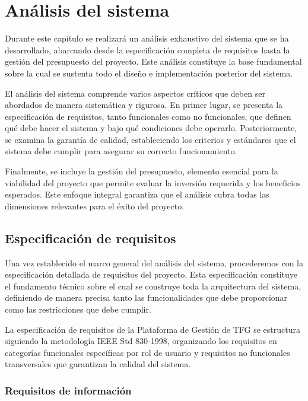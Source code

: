 \documentclass[12pt,a4paper,oneside]{report}
\begin{document}
\chapter{Análisis del sistema}\label{anuxe1lisis-del-sistema}
Durante este capítulo se realizará un análisis exhaustivo del sistema
que se ha desarrollado, abarcando desde la especificación completa de
requisitos hasta la gestión del presupuesto del proyecto. Este análisis
constituye la base fundamental sobre la cual se sustenta todo el diseño
e implementación posterior del sistema.

El análisis del sistema comprende varios aspectos críticos que deben ser
abordados de manera sistemática y rigurosa. En primer lugar, se presenta
la especificación de requisitos, tanto funcionales como no funcionales,
que definen qué debe hacer el sistema y bajo qué condiciones debe
operarlo. Posteriormente, se examina la garantía de calidad,
estableciendo los criterios y estándares que el sistema debe cumplir
para asegurar su correcto funcionamiento.

Finalmente, se incluye la gestión del presupuesto, elemento esencial
para la viabilidad del proyecto que permite evaluar la inversión
requerida y los beneficios esperados. Este enfoque integral garantiza
que el análisis cubra todas las dimensiones relevantes para el éxito del
proyecto.

\section{Especificación de
requisitos}\label{especificaciuxf3n-de-requisitos}

Una vez establecido el marco general del análisis del sistema,
procederemos con la especificación detallada de requisitos del proyecto.
Esta especificación constituye el fundamento técnico sobre el cual se
construye toda la arquitectura del sistema, definiendo de manera precisa
tanto las funcionalidades que debe proporcionar como las restricciones
que debe cumplir.

La especificación de requisitos de la Plataforma de Gestión de TFG se
estructura siguiendo la metodología IEEE Std 830-1998, organizando los
requisitos en categorías funcionales específicas por rol de usuario y
requisitos no funcionales transversales que garantizan la calidad del
sistema.

\subsection{Requisitos de
información}\label{requisitos-de-informaciuxf3n}
\end{document}
